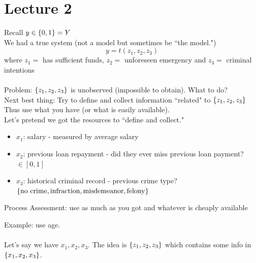 \documentclass[12pt]{article}
\begin{document}
\section{Lecture 2} 
Recall $y \in \left\{ 0,1 \right\} = Y$ \\
We had a true system (not a model but sometimes be ``the model.") $$y = t(z_1,z_2,z_3)$$ 
where $z_1 = $ has sufficient funds, $z_2 = $ unforeseen emergency and $z_3 = $ criminal intentions \\~\\
Problem: $\left\{ z_1,z_2,z_3 \right\}$ is unobserved (impossible to obtain). What to do? \\
Next best thing: Try to define and collect information ``related" to $\left\{ z_1,z_2,z_3 \right\}$ \\ 

Thus use what you have (or what is easily available). \\
Let's pretend we got the resources to ``define and collect." 
\begin{itemize} 
\item $x_1$: salary - measured by average salary
\item $x_2$: previous loan repayment - did they ever miss previous loan payment? $\in [0,1]$
\item $x_3$: historical criminal record - previous crime type? \\ $\left\{ \text{no crime}, \text{infraction}, \text{misdemeanor}, \text{felony} \right\}$
\end{itemize} 

\begin{definition} Process Assessment: use as much as you got and whatever is cheaply available \end{definition}
Example: use age. \\~\\
Let's say we have $x_1,x_2,x_3$. The idea is $\left\{ z_1,z_2,z_3 \right\}$ which contains some info in $\left\{ x_1,x_2,x_3 \right\}$. \\ 
\end{document}

